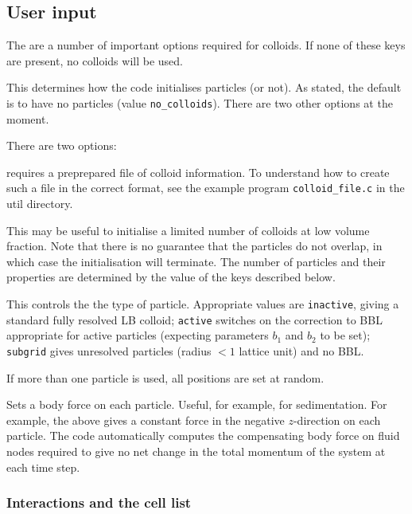 \subsection{User input}

The are a number of important options required for colloids. If
none of these keys are present, no colloids will be used.


This determines how the code initialises particles (or not). As stated, the
default is to have no particles (value \texttt{no\_colloids}). There
are two other options at the moment.

There are two options:


requires a preprepared file of colloid information. To understand
how to create such a file in the correct format,
see the example program \texttt{colloid\_file.c} in the util
directory.


This may be useful to initialise a limited number of colloids at
low volume fraction. Note that there is no guarantee that the
particles do not overlap, in which case the initialisation will
terminate. The number of particles and their properties
are determined by the value of the keys described below.


This controls the the type of particle. Appropriate values are
\texttt{inactive}, giving a standard fully resolved LB colloid;
\texttt{active} switches on the correction to BBL appropriate
for active particles (expecting parameters $b_1$ and $b_2$ to be
set); \texttt{subgrid} gives unresolved particles (radius $< 1$
lattice unit) and no BBL.

If more than one particle is used, all positions are set at random.



Sets a body force on each particle. Useful, for example, for
sedimentation. For example, the above gives a constant force in
the negative $z$-direction on each particle.
The code automatically computes the compensating body force on fluid
nodes required to give no net change in the total momentum of the
system at each time step.

\subsubsection{Interactions and the cell list}

